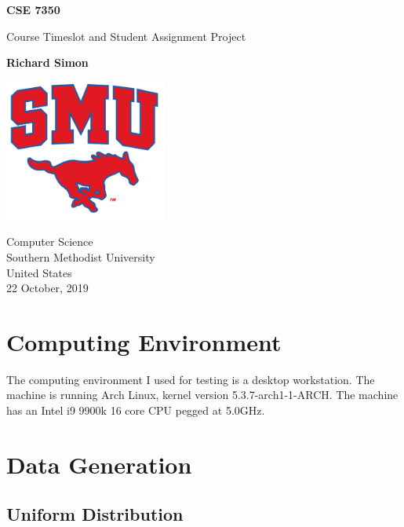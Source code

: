 \documentclass[11pt]{article}
\begin{document}
    \fancyhead{}
    \fancyfoot{}
    \cfoot{\thepage}
    \begin{titlepage}
        \begin{center}
            \vspace*{1cm}

            \textbf{CSE 7350}

            \vspace{0.5cm}
            Course Timeslot and Student Assignment Project
            \vspace{1.5cm}

            \textbf{Richard Simon}

            \vfill

            \vspace{0.8cm}

            \includegraphics[width=0.4\textwidth]{university.jpg}

            Computer Science\\
            Southern Methodist University\\
            United States\\
            22 October, 2019

        \end{center}
    \end{titlepage}
    \doublespacing
    \tableofcontents
    \newpage

    \section{Computing Environment}
	The computing environment I used for testing is a desktop workstation. The machine is running Arch Linux, kernel version 5.3.7-arch1-1-ARCH. The machine has an Intel i9 9900k 16 core CPU pegged at 5.0GHz.
    \section{Data Generation}
    \subsection{Uniform Distribution}
\end{document}

